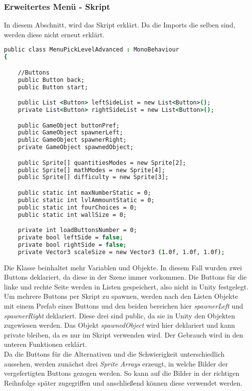 \subsubsection{Erweitertes Menü - Skript}
In diesem Abschnitt, wird das Skript erklärt. Da die Imports die selben sind, werden diese nicht erneut erklärt.
\begin{lstlisting}[language=csh, caption={MenuPickLevelAdvanced.cs Variablendeklaration}]
public class MenuPickLevelAdvanced : MonoBehaviour
{

	//Buttons
	public Button back;
	public Button start;

	public List <Button> leftSideList = new List<Button>();
	private List<Button> rightSideList = new List<Button>();

	public GameObject buttonPref;
	public GameObject spawnerLeft;
	public GameObject spawnerRight;
	private GameObject spawnedObject;

	public Sprite[] quantitiesModes = new Sprite[2];
	public Sprite[] mathModes = new Sprite[4];
	public Sprite[] difficulty = new Sprite[3];

	public static int maxNumberStatic = 0;
	public static int lvlAmmountStatic = 0;
	public static int fourChoices = 0;
	public static int wallSize = 0;

	private int loadButtonsNumber = 0;
	private bool leftSide = false;
	private bool rightSide = false;
	private Vector3 scaleSize = new Vector3 (1.0f, 1.0f, 1.0f);
\end{lstlisting}
Die Klasse beinhaltet mehr Variablen und Objekte. In diesem Fall wurden zwei Buttons deklariert, da diese in der Szene immer vorkommen. Die Buttons für die linke und rechte Seite werden in Listen gespeichert, also nicht in Unity festgelegt. Um mehrere Buttons per Skript zu spawnen, werden nach den Listen Objekte mit einem Prefab eines Buttons und den beiden bereichen hier \textit{spawnerLeft} und \textit{spawnerRight} deklariert. Diese drei sind public, da sie in Unity den Objekten zugewiesen werden. Das Objekt \textit{spawnedObject} wird hier deklariert und kann private bleiben, da es nur im Skript verwenden wird. Der Gebrauch wird in den unteren Funktionen erklärt.\\
Da die Buttons für die Alternativen und die Schwierigkeit unterschiedlich aussehen, werden zunächst drei \textit{Sprite Arrays} erzeugt, in welche Bilder der vergefertigten Buttons gezogen werden. So kann auf die Bilder in der richtigen Reihnfolge später zugegriffen und anschließend können diese verwendet werden.\\
